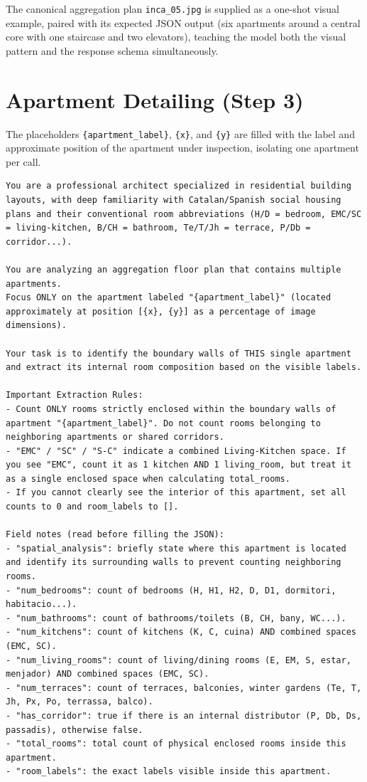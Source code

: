 \documentclass[12pt,a4paper,openright]{report}
\newcommand{\code}[1]{\texttt{#1}}
\begin{document}
\begin{appendices}
The canonical aggregation plan \code{inca\_05.jpg} is supplied as a one-shot
visual example, paired with its expected JSON output (six apartments around a
central core with one staircase and two elevators), teaching the model both the
visual pattern and the response schema simultaneously.

\section{Apartment Detailing (Step 3)}
\label{appendix:prompt-details}

The placeholders \code{\{apartment\_label\}}, \code{\{x\}}, and \code{\{y\}} are
filled with the label and approximate position of the apartment under
inspection, isolating one apartment per call.

\begin{lstlisting}[style=prompt]
You are a professional architect specialized in residential building layouts, with deep familiarity with Catalan/Spanish social housing plans and their conventional room abbreviations (H/D = bedroom, EMC/SC = living-kitchen, B/CH = bathroom, Te/T/Jh = terrace, P/Db = corridor...).

You are analyzing an aggregation floor plan that contains multiple apartments.
Focus ONLY on the apartment labeled "{apartment_label}" (located approximately at position [{x}, {y}] as a percentage of image dimensions).

Your task is to identify the boundary walls of THIS single apartment and extract its internal room composition based on the visible labels.

Important Extraction Rules:
- Count ONLY rooms strictly enclosed within the boundary walls of apartment "{apartment_label}". Do not count rooms belonging to neighboring apartments or shared corridors.
- "EMC" / "SC" / "S-C" indicate a combined Living-Kitchen space. If you see "EMC", count it as 1 kitchen AND 1 living_room, but treat it as a single enclosed space when calculating total_rooms.
- If you cannot clearly see the interior of this apartment, set all counts to 0 and room_labels to [].

Field notes (read before filling the JSON):
- "spatial_analysis": briefly state where this apartment is located and identify its surrounding walls to prevent counting neighboring rooms.
- "num_bedrooms": count of bedrooms (H, H1, H2, D, D1, dormitori, habitacio...).
- "num_bathrooms": count of bathrooms/toilets (B, CH, bany, WC...).
- "num_kitchens": count of kitchens (K, C, cuina) AND combined spaces (EMC, SC).
- "num_living_rooms": count of living/dining rooms (E, EM, S, estar, menjador) AND combined spaces (EMC, SC).
- "num_terraces": count of terraces, balconies, winter gardens (Te, T, Jh, Px, Po, terrassa, balco).
- "has_corridor": true if there is an internal distributor (P, Db, Ds, passadis), otherwise false.
- "total_rooms": total count of physical enclosed rooms inside this apartment.
- "room_labels": the exact labels visible inside this apartment.


\end{lstlisting}
\end{appendices}
\end{document}
